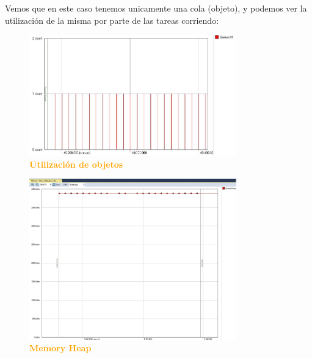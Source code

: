 \documentclass{article}
\begin{document}
Vemos que en este caso tenemos unicamente una cola (objeto), y podemos ver la utilización de la misma por parte de las tareas corriendo:\\
\begin{figure}[H]
   \centering
   \includegraphics[width=0.8\textwidth]{figures/trace5.jpg}
   \centering
   \caption{\textbf{\textcolor{Orange}{Utilización de objetos}}}
\end{figure}

\begin{figure}[H]
   \centering
   \includegraphics[width=0.8\textwidth]{figures/trace7.jpg}
   \centering
   \caption{\textbf{\textcolor{Orange}{Memory Heap}}}
\end{figure}
\end{document}
